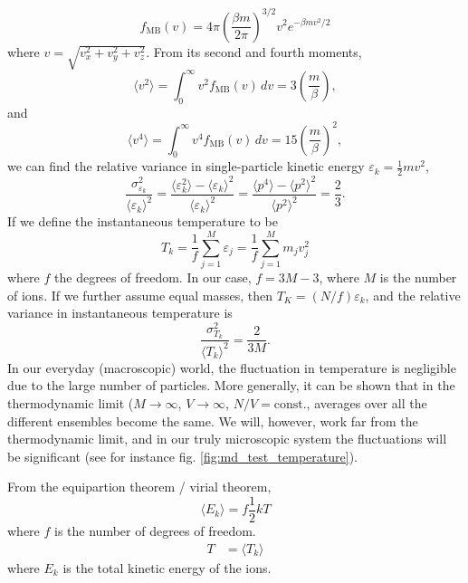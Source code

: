 \documentclass[11pt,bibliography=totoc,index=totoc]{scrbook}   %
\begin{document}
\begin{equation}
  f_{\text{MB}}(v) = 4\pi\left(\frac{\beta m}{2\pi }\right)^{3/2} v^2 e^{-\beta m v^2 / 2}
  \label{eq:maxboltz-vdist}
\end{equation}
where $v=\sqrt{v_x^2+v_y^2+v_z^2}$.
From its second and fourth moments,
\begin{equation}
  \langle v^2 \rangle = \int_0^{\infty} v^2 f_{\text{MB}}(v) \,dv = 3\left(\frac{m}{\beta}\right),
\end{equation}
and
\begin{equation}
  \langle v^4 \rangle = \int_0^{\infty} v^4 f_{\text{MB}}(v) \,dv = 15\left(\frac{m}{\beta}\right)^2,
\end{equation}
we can find the relative variance in single-particle kinetic energy $\varepsilon_k = \frac12 m v^2$,
\begin{equation}
  \frac{\sigma_{\varepsilon_k}^2}{\langle \varepsilon_k \rangle^2} 
  = \frac{\langle \varepsilon_k^2 \rangle - \langle \varepsilon_k \rangle^2}{ \langle \varepsilon_k \rangle^2 }
  = \frac{\langle p^4 \rangle - \langle p^2 \rangle^2}{ \langle p^2 \rangle^2 }
  = \frac{2}{3}.
\end{equation}
If we define the instantaneous temperature to be
\begin{equation}
  T_k = \frac{1}{f} \sum_{j=1}^M \varepsilon_j = \frac{1}{f}\sum_{j=1}^M m_j v_j^2
  \label{eq:kinetictemp}
\end{equation}
where $f$ the degrees of freedom.
In our case, $f=3M-3$, where $M$  is the number of ions.
If we further assume equal masses, then $T_K = (N/f) \varepsilon_k$, and the relative variance in instantaneous temperature is
\begin{equation}
  \frac{\sigma_{T_k}^2}{\langle T_k \rangle^2} = \frac{2}{3M}.
  \label{eq:tempvar}
\end{equation}
In our everyday (macroscopic) world, the fluctuation in temperature is negligible due to the large number of particles. 
More generally, it can be shown that in the thermodynamic limit ($M\to\infty$, $V\to\infty$, $N/V=\text{const.}$, 
averages over all the different ensembles become the same. We will, however, work far from the thermodynamic limit, 
and in our truly microscopic system the fluctuations will be significant (see for instance fig. \ref{fig:md_test_temperature}).



From the equipartion theorem / virial theorem,
\begin{equation}
  \langle E_k \rangle = f \frac12 kT
\end{equation}
where $f$ is the number of degrees of freedom.
\begin{align}
  T &= \langle T_k \rangle
\end{align}
where $E_k$ is the total kinetic energy of the ions.
\end{document}
